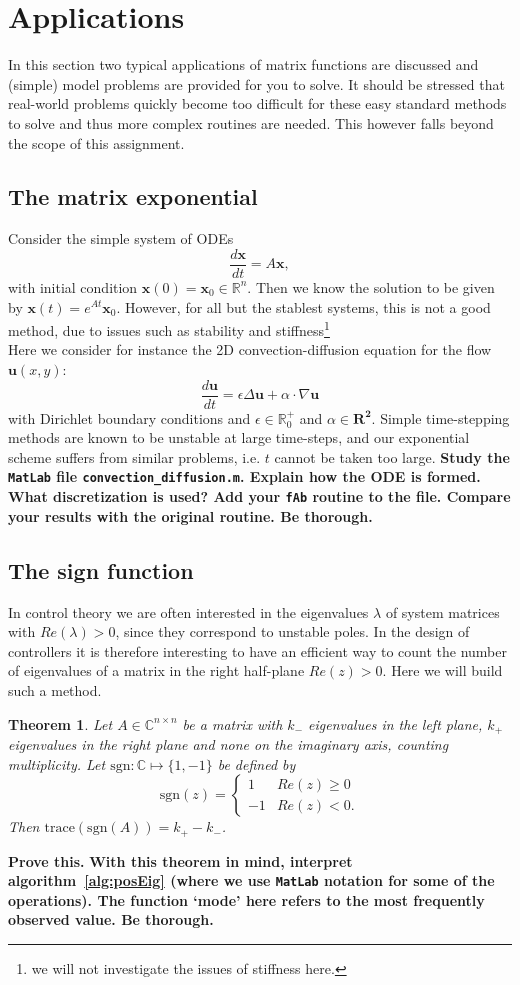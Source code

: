\documentclass[12pt]{article}
\newtheorem{theorem}{Theorem}
\begin{document}
\section{Applications}
In this section two typical applications of matrix functions are discussed and (simple) model problems are provided for you to solve. It should be stressed that real-world problems quickly become too difficult for these easy standard methods to solve and thus more complex routines are needed. This however falls beyond the scope of this assignment.
\subsection{The matrix exponential}
Consider the simple system of ODEs
$$\frac{d \mathbf{x}}{d t}=A\mathbf{x},$$
with initial condition $\mathbf{x}(0) = \mathbf{x}_0\in\mathbb{R}^n$. Then we know the solution to be given by $\mathbf{x}(t)=e^{At}\mathbf{x}_0$. However, for all but the stablest systems, this is not a good method, due to issues such as stability and stiffness\footnote{we will not investigate the issues of stiffness here.}\\
Here we consider for instance the 2D convection-diffusion equation for the flow $\mathbf{u}(x,y)$:
$$\frac{d \mathbf{u}}{d t}=\epsilon\Delta\mathbf{u}+\alpha\cdot\nabla\mathbf{u}$$
with Dirichlet boundary conditions and $\epsilon\in\mathbb{R}^{+}_0$ and $\alpha\in\mathbf{R^2}$. Simple time-stepping methods are known to be unstable at large time-steps, and our exponential scheme suffers from similar problems, i.e. $t$ cannot be taken too large. \textbf{Study the \texttt{MatLab} file \texttt{convection\_diffusion.m}. Explain how the ODE is formed. What discretization is used? Add your \texttt{fAb} routine to the file. Compare your results with the original routine. Be thorough.}
\subsection{The sign function}
In control theory we are often interested in the eigenvalues $\lambda$ of system matrices with $Re(\lambda)>0$, since they correspond to unstable poles. In the design of controllers it is therefore interesting to have an efficient way to count the number of eigenvalues of a matrix in the right half-plane $Re(z)>0$. Here we will build such a method.
\begin{theorem}\label{thm:sign}
Let $A\in\mathbb{C}^{n \times n}$ be a matrix with $k_{-}$ eigenvalues in the left plane, $k_{+}$ eigenvalues in the right plane and none on the imaginary axis, counting multiplicity. Let $\text{sgn}:\mathbb{C}\mapsto \{1,-1\}$ be defined by
$$\text{sgn}(z)= \begin{cases} 
      1 & Re(z)\geq 0 \\
      -1 & Re(z)<0. 
   \end{cases}
$$
Then $\text{trace}(\text{sgn}(A))=k_{+}-k_{-}$.
\end{theorem}
\textbf{Prove this.}
\textbf{With this theorem in mind, interpret algorithm~\ref{alg:posEig} (where we use \texttt{MatLab} notation for some of the operations). The function `mode' here refers to the most frequently observed value. Be thorough.}
\end{document}
